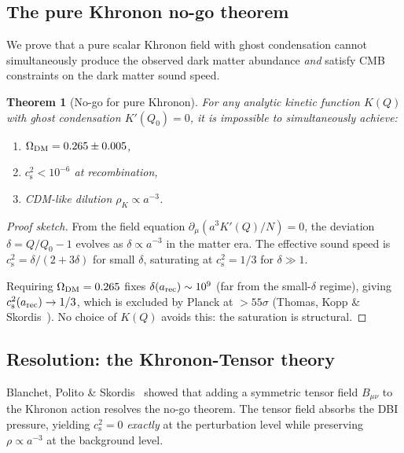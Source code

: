 \documentclass[prd,twocolumn,superscriptaddress,longbibliography,floatfix]{revtex4-2}
\newtheorem{theorem}{Theorem}
\newcommand{\cs}{c_{\mathrm{s}}}
\begin{document}
\subsection{The pure Khronon no-go theorem}
\label{sec:nogo}

We prove that a pure scalar Khronon field with ghost condensation
cannot simultaneously produce the observed dark matter abundance
\emph{and} satisfy CMB constraints on the dark matter sound speed.

\begin{theorem}[No-go for pure Khronon]
\label{thm:nogo}
For any analytic kinetic function $K(Q)$ with ghost condensation
$K'(Q_0) = 0$, it is impossible to simultaneously achieve:
\begin{enumerate}
\item[(i)] $\Omega_{\rm DM} = 0.265 \pm 0.005$,
\item[(ii)] $\cs^2 < 10^{-6}$ at recombination,
\item[(iii)] CDM-like dilution $\rho_K \propto a^{-3}$.
\end{enumerate}
\end{theorem}

\begin{proof}[Proof sketch]
From the field equation $\partial_\mu(a^3 K'(Q)/N) = 0$, the deviation
$\delta = Q/Q_0 - 1$ evolves as $\delta \propto a^{-3}$ in the
matter era.  The effective sound speed is $\cs^2 = \delta/(2+3\delta)$
for small $\delta$, saturating at $\cs^2 = 1/3$ for $\delta \gg 1$.

Requiring $\Omega_{\rm DM} = 0.265$ fixes $\delta(a_{\rm rec})
\sim 10^9$ (far from the small-$\delta$ regime), giving
$\cs^2(a_{\rm rec}) \to 1/3$, which is excluded by Planck at
$> 55\sigma$ (Thomas, Kopp \& Skordis~\cite{TKS2016}).
No choice of $K(Q)$ avoids this: the saturation is structural.
\end{proof}

\subsection{Resolution: the Khronon-Tensor theory}
\label{sec:khronon_tensor}

Blanchet, Polito \& Skordis~\cite{BS2025} showed that adding a
symmetric tensor field $B_{\mu\nu}$ to the Khronon action resolves
the no-go theorem.  The tensor field absorbs the DBI pressure,
yielding $\cs^2 = 0$ \emph{exactly} at the perturbation level
while preserving $\rho \propto a^{-3}$ at the background level.
\end{document}

